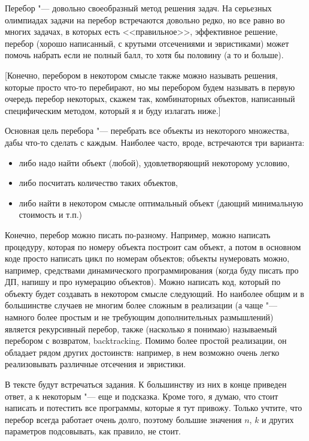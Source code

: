 
Перебор "--- довольно своеобразный метод решения задач. На серьезных олимпиадах 
задачи на перебор встречаются довольно редко, но все равно во многих задачах, в 
которых есть <<правильное>>, эффективное решение, перебор (хорошо написанный, с 
крутыми отсечениями и эвристиками) может помочь набрать если не полный балл, то 
хотя бы половину (а то и больше).

[Конечно, перебором в некотором смысле также можно называть решения, которые 
просто что-то перебирают, но мы перебором будем называть в первую очередь перебор 
некоторых, скажем так, комбинаторных объектов, написанный специфическим методом, который я и буду
излагать ниже.]

Основная цель перебора "--- перебрать все объекты из некоторого множества, дабы 
что-то сделать с каждым. Наиболее 
часто, вроде, встречаются три варианта:
\begin{itemize}
\item либо надо найти объект (любой), удовлетворяющий некоторому условию,
\item либо посчитать количество таких объектов,
\item либо найти в некотором смысле оптимальный объект (дающий минимальную 
   стоимость и т.п.)
\end{itemize}

Конечно, перебор можно писать по-разному. Например, можно написать процедуру, которая по номеру объекта построит сам объект, а потом в основном коде просто написать цикл по номерам объектов; объекты нумеровать можно, например, средствами динамического программирования (когда буду писать про ДП, напишу и про нумерацию объектов). Можно написать код, который по 
объекту будет создавать в некотором смысле следующий. Но наиболее
общим и в большинстве случаев не многим более сложным в реализации (а чаще "--- намного более простым и не требующим дополнительных размышлений) является
рекурсивный перебор, также (насколько я понимаю) называемый перебором с
возвратом, backtracking. Помимо более простой реализации, он обладает рядом других достоинств: например, в нем возможно очень легко реализовывать различные отсечения и эвристики.

В тексте будут встречаться задания. К большинству из них в конце приведен ответ, а к некоторым "--- еще и подсказка. Кроме того, я думаю, что стоит написать и потестить все программы, которые я тут привожу. Только учтите, что перебор всегда работает очень долго, поэтому большие значения $n$, $k$ и других параметров подсовывать, как правило, не стоит.







